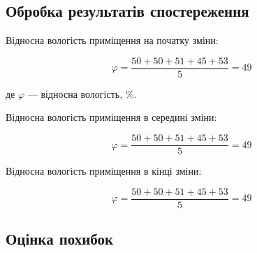 \subsection{Обробка результатів спостереження}

Відносна вологість приміщення на початку зміни:

\begin{equation}
  \varphi = \frac{50 + 50 + 51 + 45 + 53}{5} = 49
\end{equation}

де $\varphi$ --- відносна вологість, \%.

Відносна вологість приміщення в середині зміни:

\begin{equation}
  \varphi = \frac{50 + 50 + 51 + 45 + 53}{5} = 49
\end{equation}

Відносна вологість приміщення в кінці зміни:

\begin{equation}
  \varphi = \frac{50 + 50 + 51 + 45 + 53}{5} = 49
\end{equation}

\subsection{Оцінка похибок}